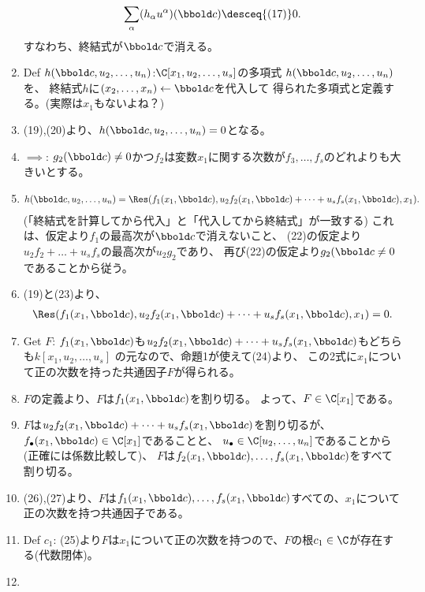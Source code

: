 \begin{myproof}
\begin{enumerate}[label=(\arabic*)]
\begin{align}
      \sum_\alpha (h_\alpha u^\alpha)(\bbold c)
      \desceq{(17)}
      0.
    \end{align}
    すなわち、終結式が$\bbold c$で消える。
    \item
    Def $h(\bbold c,u_2,\dots,u_n)$:$\C[x_1,u_2,\dots,u_s]$の多項式
    $h(\bbold c,u_2,\dots,u_n)$を、
    終結式$h$に$(x_2,\dots,x_n) \leftarrow \bbold c$を代入して
    得られた多項式と定義する。(実際は$x_1$もないよね？)
    \item
    (19),(20)より、$h(\bbold c,u_2,\dots,u_n) = 0$となる。
    \item
    $\implies$:
    $g_2(\bbold c)\neq 0$かつ$f_2$は変数$x_1$に関する次数が$f_3,\dots,f_s$のどれよりも大きいとする。
    \item
    \begin{align}
      h(\bbold c,u_2,\dots,u_n) =
      \Res(f_1(x_1,\bbold c), u_2f_2(x_1,\bbold c)+\dots+u_sf_s(x_1,\bbold c),x_1).
    \end{align}
    (「終結式を計算してから代入」と「代入してから終結式」が一致する)
    これは、仮定より$f_1$の最高次が$\bbold c$で消えないこと、
    (22)の仮定より$u_2f_2+\dots+u_sf_s$の最高次が$u_2g_2$であり、
    再び(22)の仮定より$g_2(\bbold c\neq 0$であることから従う。
    \item (19)と(23)より、
    \begin{align}
      \Res(f_1(x_1,\bbold c),u_2f_2(x_1,\bbold c)+\dots+u_sf_s(x_1,\bbold c),x_1)=0.
    \end{align}
    \item Get $F$:
    $f_1(x_1,\bbold c)$も$u_2f_2(x_1,\bbold c)+\dots+u_sf_s(x_1,\bbold c)$もどちらも$k[x_1,u_2,\dots,u_s]$
    の元なので、命題1が使えて(24)より、
    この2式に$x_1$について正の次数を持った共通因子$F$が得られる。
    \item $F$の定義より、$F$は$f_1(x_1,\bbold c)$を割り切る。
    よって、$F\in \C[x_1]$である。
    \item $F$は$u_2f_2(x_1,\bbold c)+\dots+u_sf_s(x_1,\bbold c)$を割り切るが、$f_\bullet(x_1,\bbold c)\in \C[x_1]$であることと、
    $u_\bullet \in \C[u_2,\dots,u_n]$であることから(正確には係数比較して)、
    $F$は$f_2(x_1,\bbold c),\dots,f_s(x_1,\bbold c)$をすべて割り切る。
    \item (26),(27)より、$F$は$f_1(x_1,\bbold c),\dots,f_s(x_1,\bbold c)$すべての、$x_1$について正の次数を持つ共通因子である。
    \item
    Def $c_1$: (25)より$F$は$x_1$について正の次数を持つので、$F$の根$c_1 \in \C$が存在する(代数閉体)。
    \item

\end{enumerate}
\end{myproof}
